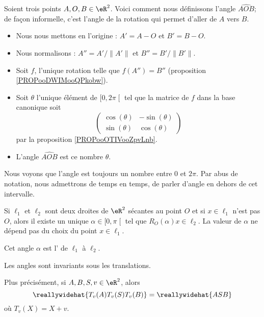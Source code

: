 \begin{definition}      \label{DEFooUPUUooKAPFrh}
	Soient trois points \( A,O,B\in \eR^2\). Voici comment nous définissons l'angle \( \widehat{AOB}\); de façon informelle, c'est l'angle de la rotation qui permet d'aller de \( A\) vers \( B\).
	\begin{itemize}
		\item Nous nous mettons en l'origine : \( A'=A-O\) et \( B'=B-O\).
		\item Nous normalisons : \( A''=A'/\| A' \|\) et \( B''=B'/\| B' \|\).
		\item Soit \( f\), l'unique rotation telle que \( f(A'')=B''\) (proposition \ref{PROPooDWIMooQPkobw}).
		\item Soit \( \theta\) l'unique élément de \( \mathopen[ 0 , 2\pi \mathclose[\) tel que la matrice de \( f\) dans la base canonique soit
		      \begin{equation}
			      \begin{pmatrix}
				      \cos(\theta) & -\sin(\theta) \\
				      \sin(\theta) & \cos(\theta)
			      \end{pmatrix}
		      \end{equation}
		      par la proposition \ref{PROPooOTIVooZpvLnb}.
		\item L'angle \( \widehat{AOB}\) est ce nombre \( \theta\).
	\end{itemize}
\end{definition}

Nous voyons que l'angle est toujours un nombre entre \( 0\) et \( 2\pi\). Par abus de notation, nous admettrons de temps en temps, de parler d'angle en dehors de cet intervalle.

\begin{lemmaDef}        \label{DEFooEGKOooRPGOAs}
	Si \( \ell_1\) et \( \ell_2\) sont deux droites de \( \eR^2\) sécantes au point \( O\) et si \( x\in\ell_1\) n'est pas \( O\), alors il existe un unique \( \alpha\in \mathopen[ 0 , \pi \mathclose[\) tel que \( R_O(\alpha)x\in \ell_2\). La valeur de \( \alpha\) ne dépend pas du choix du point \( x\in \ell_1\).

	Cet angle \( \alpha\) est l' de \( \ell_1\) à \( \ell_2\).
\end{lemmaDef}


\begin{proposition}      \label{PROPooKVSHooRODGWE}
	Les angles sont invariants sous les translations.

	Plus précisément, si \( A,B,S,v\in \eR^2\), alors
	\begin{equation}
		\reallywidehat{T_v(A)T_v(S)T_v(B)}=\reallywidehat{ASB}
	\end{equation}
	où \( T_v(X)=X+v\).
\end{proposition}

